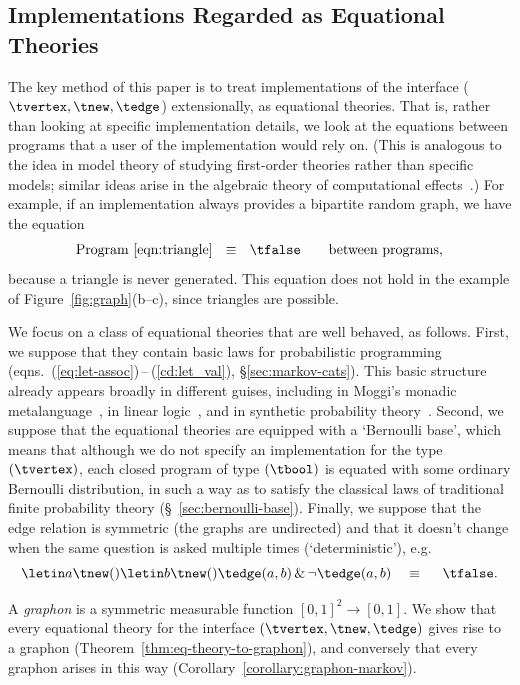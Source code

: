 \subsection{Implementations Regarded as Equational Theories}\label{sec:intro:eqthys}
The key method of this paper is to treat implementations of the
interface ($\tvertex,\tnew,\tedge$) extensionally, as equational
theories. That is, rather than looking at specific implementation
details, we look at the equations between programs that a user of the
implementation would rely on. (This is analogous to the idea in model
theory of studying first-order theories rather than specific models;
similar ideas arise in the algebraic theory of computational
effects~\cite{pp-notions}.) 
For example, if an implementation always provides a
bipartite random graph, we have the equation 
\[\text{Program~\eqref{eqn:triangle}} \ \ \equiv\ \ \tfalse \qquad\text{between programs,}\]
because a triangle is never generated. This equation does not hold in the example of Figure~\ref{fig:graph}(b--c), since
triangles are possible. 

We focus on a class of equational theories that are well behaved, as
follows.
First, we suppose that they contain basic laws for
probabilistic programming
(eqns.~(\ref{eq:let-assoc})\,--\,(\ref{cd:let_val}), \S\ref{sec:markov-cats}). This basic structure
already appears
broadly in
different guises, including in Moggi's monadic metalanguage~\cite{moggi-computational-lambda}, in linear
logic~\cite{prob-cbpv}, and in synthetic
probability theory~\cite{fritz}. Second, we suppose that the equational theories 
are equipped with a `Bernoulli base', which means that although we do not specify an implementation for the type $(\tvertex)$, each closed program of
type $(\tbool)$ is equated with some ordinary Bernoulli distribution, in such a way as to satisfy the classical laws of traditional finite probability
theory (\S~\ref{sec:bernoulli-base}).
Finally, we suppose that the edge relation is symmetric (the graphs are
undirected) and that it doesn't change when the same question is asked
multiple times (`deterministic'), e.g.
\begin{equation}\letin a{\tnew()}{\letin
                                b{\tnew()}{\tedge(a,b) \,\&\, \neg
                                \tedge(a,b)}}\ \  \ \equiv\ \ \ \ \tfalse \text. \label{eqn:intro:det}\end{equation}

A \emph{graphon} is a symmetric measurable function ${[0,1]^2\to
  [0,1]}$. We show
that every equational theory for the interface
$(\tvertex,\tnew,\tedge)$ gives rise to a graphon (Theorem~\ref{thm:eq-theory-to-graphon}), and conversely that
every graphon arises in this way
(Corollary~\ref{corollary:graphon-markov}).

